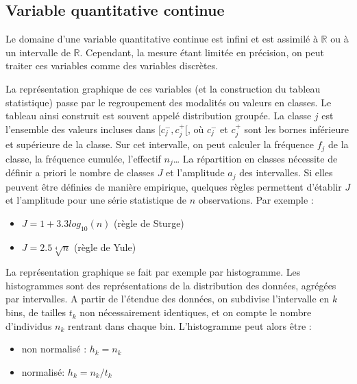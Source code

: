 \documentclass[letterpaper,10pt,french]{sphinxmanual}
\begin{document}
\sphinxAtStartPar
{}


\subsection{Variable quantitative continue}
\label{\detokenize{statsdescriptives:variable-quantitative-continue}}
\ignorespaces 
\sphinxAtStartPar
Le domaine d’une  variable quantitative continue est infini et est assimilé à \(\mathbb{R}\) ou à un intervalle de \(\mathbb{R}\). Cependant, la mesure étant limitée en précision, on peut traiter ces variables comme des variables discrètes.

\sphinxAtStartPar
La représentation graphique de ces variables (et la construction du tableau statistique) passe par le regroupement des modalités ou valeurs en classes. Le tableau ainsi construit est souvent appelé distribution groupée. La classe \(j\) est l’ensemble des valeurs incluses dans \([c^-_j,c^+_j[\), où \(c^-_j\) et \(c^+_j\) sont les bornes inférieure et supérieure de la classe. Sur cet intervalle, on peut calculer la fréquence \(f_j\) de la classe, la fréquence cumulée, l’effectif \(n_j\)… La répartition en classes nécessite de définir a priori le nombre de classes \(J\) et l’amplitude \(a_j\) des intervalles. Si elles peuvent être définies de manière empirique, quelques règles permettent d’établir \(J\) et l’amplitude pour une série statistique de \(n\) observations. Par exemple :
\begin{itemize}
\item {} 
\sphinxAtStartPar
\(J=1+3.3log_{10}(n)\) (règle de Sturge)

\item {} 
\sphinxAtStartPar
\(J=2.5\sqrt[4\,]{n}\) (règle de Yule)

\end{itemize}

\sphinxAtStartPar
La représentation graphique se fait par exemple par histogramme.
Les histogrammes sont des représentations de la distribution des données, agrégées par intervalles. A partir de l’étendue des données, on subdivise l’intervalle en \(k\) bins, de tailles \(t_k\) non nécessairement identiques, et on compte le nombre d’individus \(n_k\) rentrant dans chaque bin. L’histogramme peut alors être :
\begin{itemize}
\item {} 
\sphinxAtStartPar
non normalisé : \(h_k = n_k\)

\item {} 
\sphinxAtStartPar
normalisé: \(h_k = n_k/t_k\)

\end{itemize}
\end{document}
